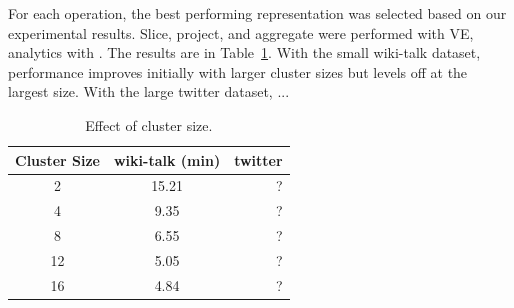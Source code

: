 For each operation, the best performing representation was selected
based on our experimental results.  Slice, project, and aggregate were
performed with VE, analytics with \hg.  The results are in
Table~\ref{tab:clustersize}.  With the small wiki-talk dataset,
performance improves initially with larger cluster sizes but levels
off at the largest size.  With the large twitter dataset, ...

\begin{table}
\centering
\caption{Effect of cluster size.}
\vspace{-0.1in}
\small
\begin{tabular}{| c | c | r |}
\hline
\multicolumn{1}{|c|}{\bfseries Cluster Size} & \multicolumn{1}{c|}{\bfseries wiki-talk (min)} & \multicolumn{1}{r|}{\bfseries twitter} \\ \hline
2 & 15.21 & ? \\ \hline
4 & 9.35 & ? \\ \hline
8 & 6.55 & ? \\ \hline
12 & 5.05 & ? \\ \hline
16 & 4.84 & ? \\ \hline
\end{tabular}
\vspace{-0.2in}
\label{tab:clustersize}
\end{table}

